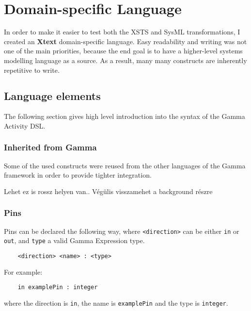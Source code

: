 \clearpage\section{Domain-specific Language}

In order to make it easier to test both the XSTS and SysML transformations, I created an \textbf{Xtext} domain-specific language. Easy readability and writing was not one of the main priorities, because the end goal is to have a higher-level systems modelling language as a source. As a result, many many constructs are inherently repetitive to write.

\subsection{Language elements}

The following section gives high level introduction into the syntax of the Gamma Activity DSL.

\subsubsection*{Inherited from Gamma}

Some of the used constructs were reused from the other languages of the Gamma framework in order to provide tighter integration.

Lehet ez is rossz helyen van.. Végülis visszamehet a background részre

\subsubsection*{Pins}\label{sssec:pins}

Pins can be declared the following way, where \verb|<direction>| can be either \verb|in| or \verb|out|, and \verb|type| a valid Gamma Expression type.

\begin{verbatim}
	<direction> <name> : <type>
\end{verbatim}

For example: 

\begin{verbatim}
	in examplePin : integer
\end{verbatim}

where the direction is \verb|in|, the name is \verb|examplePin| and the type is \verb|integer|.

